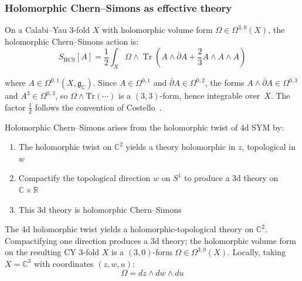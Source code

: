 \subsubsection{Holomorphic Chern--Simons as effective theory}

\begin{definition}
On a Calabi--Yau 3-fold $X$ with holomorphic volume form $\Omega \in \Omega^{3,0}(X)$, the
holomorphic Chern--Simons action is:
\[S_{\text{HCS}}[A] = \frac{1}{2}\int_{X} \Omega \wedge \operatorname{Tr}\left(A
\wedge \bar{\partial} A + \frac{2}{3} A \wedge A \wedge A\right)\]

where $A \in \Omega^{0,1}(X, \mathfrak{g}_{\mathbb{C}})$. Since $A \in \Omega^{0,1}$ and $\bar\partial A \in \Omega^{0,2}$, the forms $A \wedge \bar\partial A \in \Omega^{0,3}$ and $A^3 \in \Omega^{0,3}$, so $\Omega \wedge \text{Tr}(\cdots)$ is a $(3,3)$-form, hence integrable over~$X$. The factor $\frac{1}{2}$ follows the convention of Costello~\cite{costello-renormalization}.
\end{definition}

\begin{theorem}\label{thm:hcs-dimensional-reduction}
Holomorphic Chern--Simons \cite{costello-renormalization} arises from the holomorphic twist of 4d SYM by:
\begin{enumerate}
\item The holomorphic twist on $\mathbb{C}^2$ yields a theory holomorphic in $z$, topological in~$w$
\item Compactify the topological direction $w$ on $S^1$ to produce a 3d theory on $\mathbb{C} \times \mathbb{R}$
\item This 3d theory is holomorphic Chern--Simons
\end{enumerate}

The 4d holomorphic twist yields a holomorphic-topological theory on $\mathbb{C}^2$. Compactifying one direction produces a 3d theory; the holomorphic volume form on the resulting CY 3-fold $X$ is a $(3,0)$-form $\Omega \in \Omega^{3,0}(X)$. Locally, taking $X = \mathbb{C}^3$ with coordinates $(z, w, u)$:
\[\Omega = dz \wedge dw \wedge du\]
\end{theorem}

